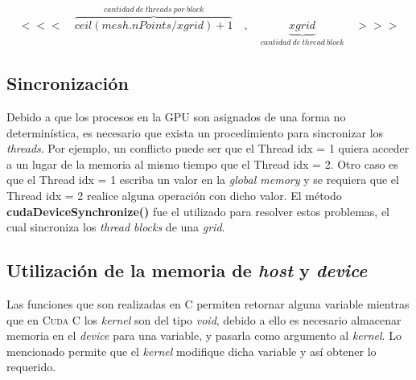 \begin{align*}
		<<<\quad \overbrace{ceil(mesh.nPoints/xgrid)+1}^{cantidad \>de\> \textit{threads}\> por\> \textit{block}}\quad,\quad \underbrace{xgrid}_{cantidad\>de\>thread\>block} \quad>>>
\end{align*}

\subsection{Sincronización}

Debido a que los procesos en la GPU son asignados de una forma no determinística, es necesario que exista un procedimiento para sincronizar los \textit{threads}. Por ejemplo, un conflicto puede ser que el Thread idx = 1 quiera acceder a un lugar de la memoria al mismo tiempo que el Thread idx = 2. Otro caso es que el Thread idx = 1 escriba un valor en la \textit{global memory} y se requiera que el Thread idx = 2 realice alguna operación con dicho valor. El método \textbf{cudaDeviceSynchronize()} fue el utilizado para resolver estos problemas, el cual sincroniza los \textit{thread blocks} de una \textit{grid}.

\subsection{Utilización de la memoria de \textit{host} y \textit{device}}


Las funciones que son realizadas en \textsc{C} permiten retornar alguna variable mientras que en \textsc{Cuda C} los \textit{kernel} son del tipo \textit{void}, debido a ello es necesario almacenar memoria en el \textit{device} para una variable, y pasarla como argumento al \textit{kernel}. Lo mencionado permite que el \textit{kernel} modifique dicha variable y así obtener lo requerido. 

